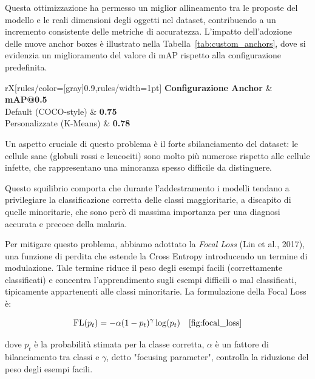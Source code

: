 \documentclass[minted, draw]{../tex/hebdomon}
\begin{document}
Questa ottimizzazione ha permesso un miglior allineamento tra le proposte del modello e le reali dimensioni degli oggetti nel dataset, contribuendo a un incremento consistente delle metriche di accuratezza. L'impatto dell’adozione delle nuove anchor boxes è illustrato nella Tabella~\ref{tab:custom_anchors}, dove si evidenzia un miglioramento del valore di mAP rispetto alla configurazione predefinita.

\begin{table}[!ht]
	\centering
	\begin{NiceTabular}{rX}[rules/color=[gray]{0.9},rules/width=1pt]
		\CodeBefore
		\Body
		\toprule
		\textbf{Configurazione Anchor} & \textbf{mAP@0.5} \\
		\midrule
		Default (COCO-style)         & \textbf{0.75} \\
		Personalizzate (K-Means)     & \textbf{0.78} \\
		\bottomrule
	\end{NiceTabular}
	\caption{Confronto tra ancore standard e personalizzate.}
	\label{tab:custom_anchors}
\end{table}


Un aspetto cruciale di questo problema è il forte sbilanciamento del dataset: le cellule sane (globuli rossi e leucociti) sono molto più numerose rispetto alle cellule infette, che rappresentano una minoranza spesso difficile da distinguere.

Questo squilibrio comporta che durante l’addestramento i modelli tendano a privilegiare la classificazione corretta delle classi maggioritarie, a discapito di quelle minoritarie, che sono però di massima importanza per una diagnosi accurata e precoce della malaria.

Per mitigare questo problema, abbiamo adottato la \textit{Focal Loss} (Lin et al., 2017), una funzione di perdita che estende la Cross Entropy introducendo un termine di modulazione. Tale termine riduce il peso degli esempi facili (correttamente classificati) e concentra l’apprendimento sugli esempi difficili o mal classificati, tipicamente appartenenti alle classi minoritarie. La formulazione della Focal Loss è:

\[
\text{FL}(p_t) = -\alpha (1 - p_t)^\gamma \log(p_t) \quad \ref{fig:focal_loss}
\]

dove \( p_t \) è la probabilità stimata per la classe corretta, \(\alpha\) è un fattore di bilanciamento tra classi e \(\gamma\), detto "focusing parameter", controlla la riduzione del peso degli esempi facili.
\end{document}
